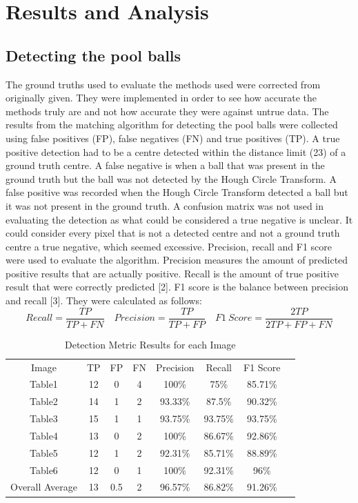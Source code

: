 \documentclass[12pt]{article}
\begin{document}
\section{Results and Analysis}
\subsection{Detecting the pool balls}
The ground truths used to evaluate the methods used were corrected from originally given. They were implemented in order to see how accurate the methods truly are and not how accurate they were against untrue data. 
The results from the matching algorithm for detecting the pool balls were collected using false positives (FP), false negatives (FN) and true positives (TP). A true positive detection had to be a centre detected within the distance limit (23) of a ground truth centre. A false negative is when a ball that was present in the ground truth but the ball was not detected by the Hough Circle Transform. A false positive was recorded when the Hough Circle Transform detected a ball but it was not present in the ground truth. A confusion matrix was not used in evaluating the detection as what could be considered a true negative is unclear. It could consider every pixel that is not a detected centre and not a ground truth centre a true negative, which seemed excessive. Precision, recall and F1 score were used to evaluate the algorithm. Precision measures the amount of predicted positive results that are actually positive. Recall is the amount of true positive result that were correctly predicted [2]. F1 score is the balance between precision and recall [3]. They were calculated as follows:
\[
Recall = \frac{TP}{TP + FN}
\quad
Precision = \frac{TP}{TP+FP}
\quad
F1 \ Score = \frac{2TP}{2TP + FP + FN}
\]
\begin{table}[H]
    \centering
    \begin{tabular}{|c|c|c|c|c|c|c|c|}
    \hline
        Image & TP & FP & FN & Precision & Recall & F1 Score \\
        Table1 & 12 & 0 & 4 &  100\% & 75\% & 85.71\% \\
        Table2 & 14 & 1 & 2 &  93.33\% & 87.5\% & 90.32\%\\
        Table3 & 15 & 1 & 1 &  93.75\% & 93.75\% & 93.75\% \\
        Table4 & 13 & 0 & 2 &  100\% & 86.67\% & 92.86\% \\
        Table5 & 12 & 1 & 2  & 92.31\% & 85.71\% & 88.89\% \\
        Table6 & 12 & 0 & 1 &  100\% & 92.31\% & 96\% \\
        \hline
        Overall Average & 13 & 0.5 & 2 & 96.57\% & 86.82\% & 91.26\% \\
        \hline
    \end{tabular}
    \caption{Detection Metric Results for each Image}
    \label{tab:placeholder}
\end{table}
\end{document}
